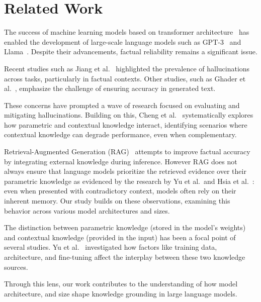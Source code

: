 \section{Related Work}

The success of machine learning models based on transformer architecture~\cite{attention_is_all_you_need} has enabled the development of large-scale language models such as GPT-3~\cite{gpt3} and Llama~\cite{llama}.
Despite their advancements, factual reliability remains a significant issue.

Recent studies such as Jiang et al.~\cite{how_can_we_know} highlighted the prevalence of hallucinations across tasks, particularly in factual contexts.
Other studies, such as Ghader et al.~\cite{can_rag_models_reason}, emphasize the challenge of ensuring accuracy in generated text.

These concerns have prompted a wave of research focused on evaluating and mitigating hallucinations.
Building on this, Cheng et al.~\cite{understanding_the_interplay} systematically explores how parametric and contextual knowledge interact, identifying scenarios where contextual knowledge can degrade performance, even when complementary.

Retrieval-Augmented Generation (RAG)~\cite{rag} attempts to improve factual accuracy by integrating external knowledge during inference.
However RAG does not always ensure that language models prioritize the retrieved evidence over their parametric knowledge as evidenced by the research by Yu et al.\ and Hsia et al.~\cite{ragged,factual_recall}: even when presented with contradictory context, models often rely on their inherent memory.
Our study builds on these observations, examining this behavior across various model architectures and sizes.

The distinction between parametric knowledge (stored in the model's weights) and contextual knowledge (provided in the input) has been a focal point of several studies.
Yu et al.~\cite{factual_recall} investigated how factors like training data, architecture, and fine-tuning affect the interplay between these two knowledge sources.

Through this lens, our work contributes to the understanding of how model architecture, and size shape knowledge grounding in large language models.

